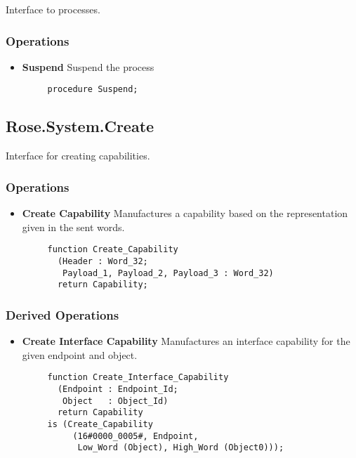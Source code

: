 Interface to processes.

\subsubsection{Operations}

\begin{itemize}
    \item \textbf{Suspend} Suspend the process 

    \begin{verbatim}
     procedure Suspend;
    \end{verbatim}
    
\end{itemize}

\subsection{Rose.System.Create}

Interface for creating capabilities.

\subsubsection{Operations}

\begin{itemize}
    \item \textbf{Create Capability} Manufactures a capability based on the representation given
    in the sent words.
    
    \begin{verbatim}
     function Create_Capability
       (Header : Word_32;
        Payload_1, Payload_2, Payload_3 : Word_32)
       return Capability;    
    \end{verbatim}
    
\end{itemize}

\subsubsection{Derived Operations}

\begin{itemize}
    \item \textbf{Create Interface Capability} Manufactures an interface capability for the given endpoint and object.
    
    \begin{verbatim}
     function Create_Interface_Capability
       (Endpoint : Endpoint_Id;
        Object   : Object_Id)
       return Capability
     is (Create_Capability 
          (16#0000_0005#, Endpoint, 
           Low_Word (Object), High_Word (Object0)));
     
    \end{verbatim}
    
\end{itemize}


